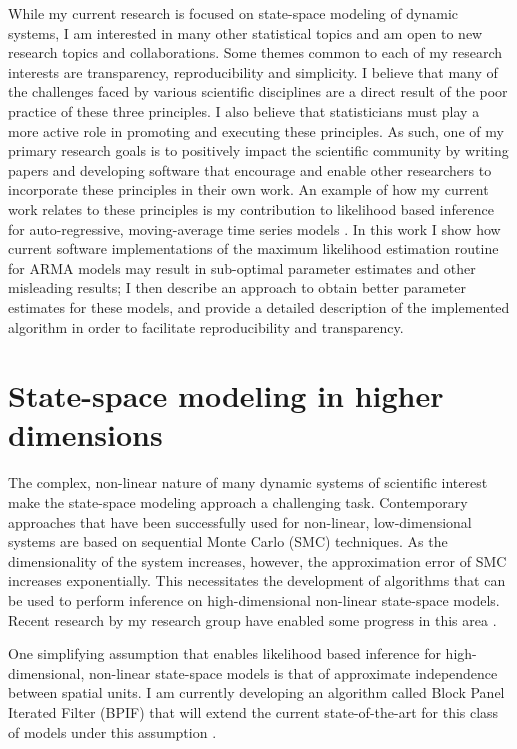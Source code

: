 \documentclass{article}
\begin{document}
While my current research is focused on state-space modeling of dynamic systems, I am interested in many other statistical topics and am open to new research topics and collaborations. 
Some themes common to each of my research interests are transparency, reproducibility and simplicity.
I believe that many of the challenges faced by various scientific disciplines are a direct result of the poor practice of these three principles.
I also believe that statisticians must play a more active role in promoting and executing these principles.
As such, one of my primary research goals is to positively impact the scientific community by writing papers and developing software that encourage and enable other researchers to incorporate these principles in their own work. 
An example of how my current work relates to these principles is my contribution to likelihood based inference for auto-regressive, moving-average time series models \cite{wheeler2023-a}. 
In this work I show how current software implementations of the maximum likelihood estimation routine for ARMA models may result in sub-optimal parameter estimates and other misleading results; I then describe an approach to obtain better parameter estimates for these models, and provide a detailed description of the implemented algorithm in order to facilitate reproducibility and transparency. 

\section{State-space modeling in higher dimensions}\label{sec:methods}

The complex, non-linear nature of many dynamic systems of scientific interest make the state-space modeling approach a challenging task. 
Contemporary approaches that have been successfully used for non-linear, low-dimensional systems are based on sequential Monte Carlo (SMC) techniques. 
As the dimensionality of the system increases, however, the approximation error of SMC increases exponentially. 
This necessitates the development of algorithms that can be used to perform inference on high-dimensional non-linear state-space models. 
Recent research by my research group have enabled some progress in this area \cite{ionides22}.

One simplifying assumption that enables likelihood based inference for high-dimensional, non-linear state-space models is that of approximate independence between spatial units. 
I am currently developing an algorithm called Block Panel Iterated Filter (BPIF) that will extend the current state-of-the-art for this class of models under this assumption \cite{wheeler2023-b}. 
\end{document}
